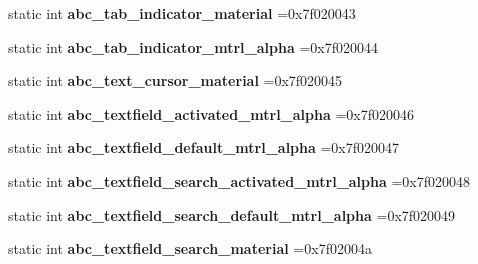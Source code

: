 \begin{DoxyCompactItemize}
static int {\bfseries abc\+\_\+tab\+\_\+indicator\+\_\+material} =0x7f020043
\item 
\mbox{\label{classandroid_1_1support_1_1v7_1_1cardview_1_1R_1_1drawable_af00a62e341d4c1dd2ff86509f4745527}} 
static int {\bfseries abc\+\_\+tab\+\_\+indicator\+\_\+mtrl\+\_\+alpha} =0x7f020044
\item 
\mbox{\label{classandroid_1_1support_1_1v7_1_1cardview_1_1R_1_1drawable_a60ad79059c8b3b75c24c198a2bcb9d7a}} 
static int {\bfseries abc\+\_\+text\+\_\+cursor\+\_\+material} =0x7f020045
\item 
\mbox{\label{classandroid_1_1support_1_1v7_1_1cardview_1_1R_1_1drawable_a03784b85cdac084fc2ae76636881ad74}} 
static int {\bfseries abc\+\_\+textfield\+\_\+activated\+\_\+mtrl\+\_\+alpha} =0x7f020046
\item 
\mbox{\label{classandroid_1_1support_1_1v7_1_1cardview_1_1R_1_1drawable_a08f735daf0853d972abf88978d0468b7}} 
static int {\bfseries abc\+\_\+textfield\+\_\+default\+\_\+mtrl\+\_\+alpha} =0x7f020047
\item 
\mbox{\label{classandroid_1_1support_1_1v7_1_1cardview_1_1R_1_1drawable_ac854fca83d5f39ecc38679cdca0634e3}} 
static int {\bfseries abc\+\_\+textfield\+\_\+search\+\_\+activated\+\_\+mtrl\+\_\+alpha} =0x7f020048
\item 
\mbox{\label{classandroid_1_1support_1_1v7_1_1cardview_1_1R_1_1drawable_ac89f83ff1f4769001515d66443a2baa5}} 
static int {\bfseries abc\+\_\+textfield\+\_\+search\+\_\+default\+\_\+mtrl\+\_\+alpha} =0x7f020049
\item 
\mbox{\label{classandroid_1_1support_1_1v7_1_1cardview_1_1R_1_1drawable_aa3794420f6efcfe79e7cfe334a6160fa}} 
static int {\bfseries abc\+\_\+textfield\+\_\+search\+\_\+material} =0x7f02004a
\item 
\mbox{\label{classandroid_1_1support_1_1v7_1_1cardview_1_1R_1_1drawable_ad5eafc5f987af09745bf34fe594e3d76}} 

\end{DoxyCompactItemize}
